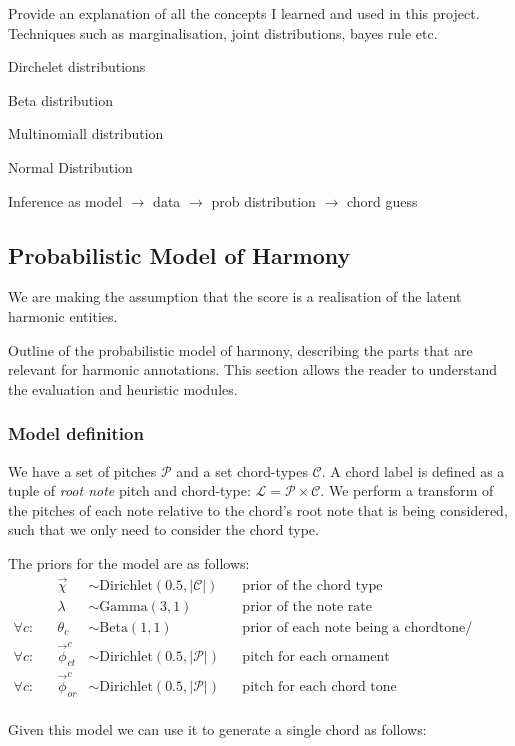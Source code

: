 \documentclass[12pt,a4paper,twoside,openright]{report}
\theoremstyle{definition}
\begin{document}
Provide an explanation of all the concepts I learned and used in this project. 
Techniques such as marginalisation, joint distributions, bayes rule etc. 

Dirchelet distributions

Beta distribution  

Multinomiall distribution 

Normal Distribution 

\par 
Inference as model $\to$ data $\to$ prob distribution $\to$ chord guess

\subsection{Probabilistic Model of Harmony}
We are making the assumption that the score is a realisation of the latent harmonic entities. 

Outline of the probabilistic model of harmony, describing the parts that are relevant for harmonic annotations. This section allows the reader to understand the evaluation and heuristic modules.

\subsubsection{Model definition}
We have a set of pitches $\mathcal{P}$ and a set chord-types $\mathcal{C}$. A chord label is defined as a tuple of \textit{root note} pitch and chord-type: $\mathcal{L} = \mathcal{P} \times \mathcal{C}$. We perform a transform of the pitches of each note relative to the chord's root note that is being considered, such that we only need to consider the chord type. 

\par
The priors for the model are as follows:
\begin{equation}
\begin{align*} 
              && \vec{\chi} &\sim \text{Dirichlet}(0.5, |\mathcal{C}|)     && \text{prior of the chord type} \\
              && \lambda &\sim \text{Gamma}(3, 1)     && \text{prior of the note rate} \\
  \forall c:  && \theta_c  &\sim \text{Beta}(1, 1)        && \text{prior of each note being a chordtone/ ornament} \\
  \forall c:  && \vec{\phi}_{ct}^{c}  &\sim \text{Dirichlet}(0.5, |\mathcal{P}|)        && \text{pitch for each ornament} \\
  \forall c:  && \vec{\phi}_{or}^{c}  &\sim \text{Dirichlet}(0.5, |\mathcal{P}|)        && \text{pitch for each chord tone} \\
\end{align*}
\label{eq:phm}
\end{equation}
\par 
Given this model we can use it to generate a single chord as follows:
\end{document}
